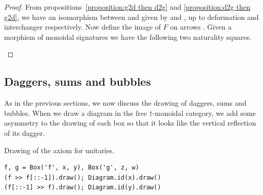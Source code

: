 \begin{proof}
From propositions~\ref{proposition:g2d then d2g} and \ref{proposition:d2g then g2d}, we have an isomorphism between  and  given by  and , up to deformation and interchanger respectively.
Now define the image of $F$ on arrows .
Given a morphism of monoidal signatures  we have the following two naturality squares.
\begin{center}
    \qquad {} \qquad
\end{center}
\end{proof}

\subsection{Daggers, sums and bubbles}

As in the previous sections, we now discuss the drawing of daggers, sums and bubbles.
When we draw a diagram in the free $\dagger$-monoidal category, we add some asymmetry to the drawing of each box so that it looks like the vertical reflection of its dagger.

\begin{example}
{\normalfont Drawing of the axiom for unitaries.}

\begin{verbatim}
f, g = Box('f', x, y), Box('g', z, w)
(f >> f[::-1]).draw(); Diagram.id(x).draw()
(f[::-1] >> f).draw(); Diagram.id(y).draw()
\end{verbatim}

\begin{center}
 \hspace{100pt}
\end{center}
\end{example}

